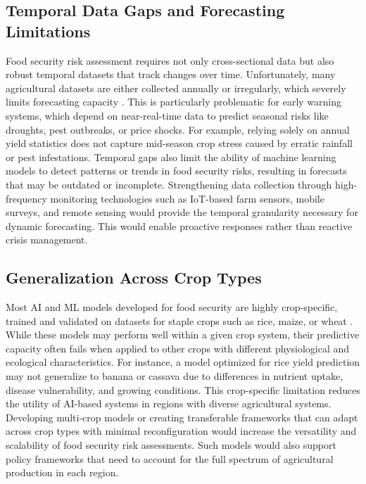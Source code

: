 \documentclass[preprint,12pt]{elsarticle}
\begin{document}
	\subsection{Temporal Data Gaps and Forecasting Limitations}
	
	Food security risk assessment requires not only cross-sectional data but
	also robust temporal datasets that track changes over time.
	Unfortunately, many agricultural datasets are either collected annually
	or irregularly, which severely limits forecasting capacity \cite{ref88}. This
	is particularly problematic for early warning systems, which depend on
	near-real-time data to predict seasonal risks like droughts, pest
	outbreaks, or price shocks. For example, relying solely on annual yield
	statistics does not capture mid-season crop stress caused by erratic
	rainfall or pest infestations. Temporal gaps also limit the ability of
	machine learning models to detect patterns or trends in food security
	risks, resulting in forecasts that may be outdated or incomplete.
	Strengthening data collection through high-frequency monitoring
	technologies such as IoT-based farm sensors, mobile surveys, and remote
	sensing would provide the temporal granularity necessary for dynamic
	forecasting. This would enable proactive responses rather than reactive
	crisis management.
	
	\subsection{Generalization Across Crop Types}
	
	Most AI and ML models developed for food security are highly
	crop-specific, trained and validated on datasets for staple crops such
	as rice, maize, or wheat \cite{ref89}. While these models may perform well
	within a given crop system, their predictive capacity often fails when
	applied to other crops with different physiological and ecological
	characteristics. For instance, a model optimized for rice yield
	prediction may not generalize to banana or cassava due to differences in
	nutrient uptake, disease vulnerability, and growing conditions. This
	crop-specific limitation reduces the utility of AI-based systems in
	regions with diverse agricultural systems. Developing multi-crop models
	or creating transferable frameworks that can adapt across crop types
	with minimal reconfiguration would increase the versatility and
	scalability of food security risk assessments. Such models would also
	support policy frameworks that need to account for the full spectrum of
	agricultural production in each region.
	
\end{document}
